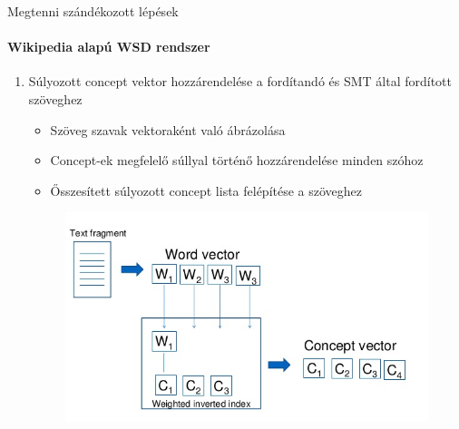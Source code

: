 \begin{frame}{Megtenni szándékozott lépések}
\framesubtitle{Wikipedia alapú WSD rendszer}

	\begin{enumerate}
		\restorecounter
		
		\item Súlyozott concept vektor hozzárendelése a fordítandó és SMT által fordított szöveghez
		\begin{itemize}
			\item Szöveg szavak vektoraként való ábrázolása 
			\item Concept-ek megfelelő súllyal történő hozzárendelése minden szóhoz
			\item Ősszesített súlyozott concept lista felépítése a szöveghez
		\end{itemize}
		
		\begin{figure}[t]
			\includegraphics[scale=0.4]{images/textfragment}
 		\end{figure}			
 		
	\savecounter
 	
	\end{enumerate}
	
\end{frame}

